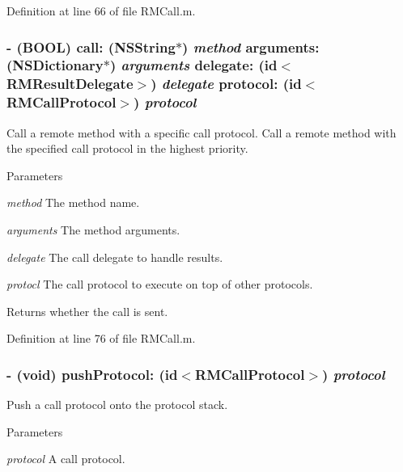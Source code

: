 Definition at line 66 of file RMCall.m.\hypertarget{interface_r_m_call_ae6750e4bc12f50170b839e1b96227a87}{
\subsubsection[{call:arguments:delegate:protocol:}]{\setlength{\rightskip}{0pt plus 5cm}-\/ (BOOL) call: (NSString$\ast$) {\em method}\/ arguments: (NSDictionary$\ast$) {\em arguments}\/ delegate: (id$<${\bf RMResultDelegate}$>$) {\em delegate}\/ protocol: (id$<${\bf RMCallProtocol}$>$) {\em protocol}}}
\label{interface_r_m_call_ae6750e4bc12f50170b839e1b96227a87}


Call a remote method with a specific call protocol. Call a remote method with the specified call protocol in the highest priority.


\begin{DoxyParams}{Parameters}
\item[{\em method}]The method name. \item[{\em arguments}]The method arguments. \item[{\em delegate}]The call delegate to handle results. \item[{\em protocl}]The call protocol to execute on top of other protocols.\end{DoxyParams}
\begin{DoxyReturn}{Returns}
whether the call is sent. 
\end{DoxyReturn}


Definition at line 76 of file RMCall.m.\hypertarget{interface_r_m_call_afb23a22f89df78e62f45f2af2dd41623}{
\subsubsection[{pushProtocol:}]{\setlength{\rightskip}{0pt plus 5cm}-\/ (void) pushProtocol: (id$<${\bf RMCallProtocol}$>$) {\em protocol}}}
\label{interface_r_m_call_afb23a22f89df78e62f45f2af2dd41623}


Push a call protocol onto the protocol stack. 
\begin{DoxyParams}{Parameters}
\item[{\em protocol}]A call protocol. \end{DoxyParams}


